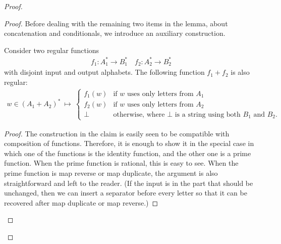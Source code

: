 \begin{proof}
\begin{proof}
        Before dealing with the remaining two items in the lemma, about concatenation and conditionals, we introduce an auxiliary construction.
    
        \begin{claim}\label{claim:conditional}
            Consider two regular functions 
            \begin{align*}
            f_1 : A_1^* \to B_1^* \quad f_2 : A_2^* \to B_2^*
            \end{align*}
            with disjoint input and output alphabets. The following function $f_1 + f_2$ is also regular:
                    \begin{align*}
        w \in (A_1 + A_2)^* 
        \  \mapsto \ 
        \begin{cases}
            f_1(w) & \text{if $w$ uses only letters from $A_1$}\\
            f_2(w) & \text{if $w$ uses only letters from $A_2$}\\
            \bot & \text{otherwise, where $\bot$ is a string using both $B_1$ and $B_2$.}
        \end{cases}
        \end{align*}
        \end{claim}
        \begin{proof}
            The construction in the claim is easily seen to be compatible with composition of functions. Therefore, it is enough to show it in the special case in which one of the functions is the identity function, and the other one is a prime function. When the prime function is rational, this is easy to see. When the prime function is map reverse or map duplicate, the argument is also straightforward and left to the reader.  (If the input is in the part that should be unchanged, then we can insert a separator before every letter so that it can be recovered after map duplicate or map reverse.)
        \end{proof}


\end{proof}
\end{proof}
